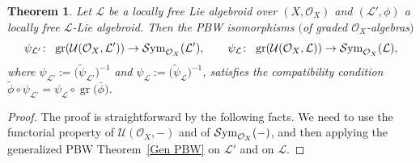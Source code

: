 \documentclass[pdftex]{sigma}
\numberwithin{equation}{section}
\newtheorem{Thm}{Theorem}[section]
\theoremstyle{definition}
\begin{document}
\begin{Thm} \label{L-version PBW}
Let $\mathcal{L}$ be a locally free Lie algebroid over $(X, \mathcal{O}_X)$ and $(\mathcal{L}', \phi)$ a locally free $\mathcal{L}$-Lie algebroid. Then the PBW isomorphisms $($of graded $\mathcal{O}_X$-algebras$)$
\[
\psi_{\mathcal{L}'}\colon \ \operatorname{gr}(\mathcal{U}(\mathcal{O}_X, \mathcal{L}')) \rightarrow \mathcal{S}{\rm ym}_{\mathcal{O}_X} (\mathcal{L}'),\qquad
	\psi_{\mathcal{L}}\colon \ \operatorname{gr}(\mathcal{U}(\mathcal{O}_X, \mathcal{L})) \rightarrow \mathcal{S}{\rm ym}_{\mathcal{O}_X} (\mathcal{L}),
\]
 where $\psi_{\mathcal{L}'}:=\bigl(\tilde{\psi}_{\mathcal{L}'}\bigr)^{-1}$ and $\psi_{\mathcal{L}}:=\bigl(\tilde{\psi}_{\mathcal{L}}\bigr)^{-1}$,
	satisfies the compatibility condition $\tilde{\phi} \circ \psi_{\mathcal{L}'}= \psi_{\mathcal{L}} \circ \operatorname{gr}\bigl(\bar{\phi}\bigr)$.
\end{Thm}
\begin{proof}The proof is straightforward by the following facts.
	We need to use the functorial property of $\mathcal{U}(\mathcal{O}_X, -)$ and of $\mathcal{S}{\rm ym}_{\mathcal{O}_X} (-)$, and then applying the generalized PBW Theorem~\ref{Gen PBW} on $\mathcal{L}'$ and on $\mathcal{L}$.
\end{proof}
\end{document}
